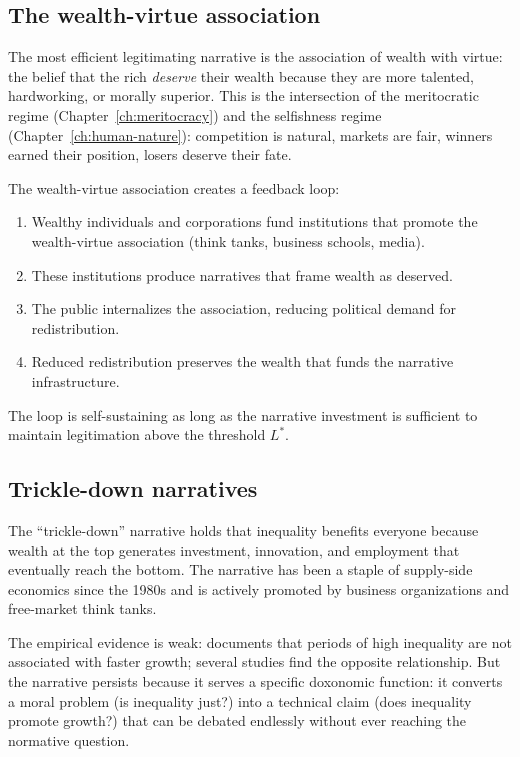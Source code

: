 \subsection{The wealth-virtue association}

The most efficient legitimating narrative is the association of wealth with virtue: the belief that the rich \emph{deserve} their wealth because they are more talented, hardworking, or morally superior.
This is the intersection of the meritocratic regime (Chapter~\ref{ch:meritocracy}) and the selfishness regime (Chapter~\ref{ch:human-nature}): competition is natural, markets are fair, winners earned their position, losers deserve their fate.

\begin{model}
\label{mod:wealth-virtue}
The wealth-virtue association creates a feedback loop:
\begin{enumerate}[nosep]
  \item Wealthy individuals and corporations fund institutions that promote the wealth-virtue association (think tanks, business schools, media).
  \item These institutions produce narratives that frame wealth as deserved.
  \item The public internalizes the association, reducing political demand for redistribution.
  \item Reduced redistribution preserves the wealth that funds the narrative infrastructure.
\end{enumerate}
The loop is self-sustaining as long as the narrative investment is sufficient to maintain legitimation above the threshold $L^*$.
\end{model}

\subsection{Trickle-down narratives}

The ``trickle-down'' narrative holds that inequality benefits everyone because wealth at the top generates investment, innovation, and employment that eventually reach the bottom.
The narrative has been a staple of supply-side economics since the 1980s and is actively promoted by business organizations and free-market think tanks.

The empirical evidence is weak: \textcite{piketty2014} documents that periods of high inequality are not associated with faster growth; several studies find the opposite relationship.
But the narrative persists because it serves a specific doxonomic function: it converts a moral problem (is inequality just?) into a technical claim (does inequality promote growth?) that can be debated endlessly without ever reaching the normative question.

